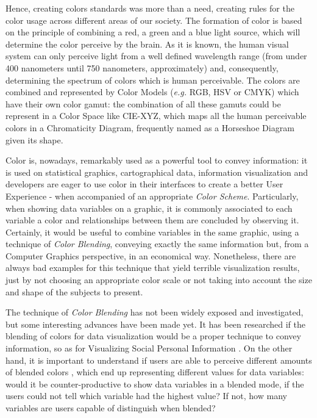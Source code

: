 %
Hence, creating colors standards was more than a need, creating rules for the color usage across different areas
of our society. The formation of color is based on the principle of combining a red, a green and a blue light
source, which will determine the color perceive by the brain. As it is known, the human visual system can only
perceive light from a well defined wavelength range (from under 400 nanometers until 750 nanometers, approximately)
and, consequently, determining the spectrum of colors which is human perceivable. The colors are combined and
represented by Color Models (\emph{e.g.} RGB, HSV or CMYK) which have their own color gamut: the combination
of all these gamuts could be represent in a Color Space like CIE-XYZ, which maps all the human perceivable
colors in a Chromaticity Diagram, frequently named as a Horseshoe Diagram given its shape. \par
%
Color is, nowadays, remarkably used as a powerful tool to convey information: it is used on statistical graphics,
cartographical data, information visualization and developers are eager to use color in their interfaces to
create a better User Experience - when accompanied of an appropriate \emph{Color Scheme}. Particularly, when
showing data variables on a graphic, it is commonly associated to each variable a color and relationships between
them are concluded by observing it. Certainly, it would be useful to combine variables in the same graphic, using
a technique of \emph{Color Blending}, conveying exactly the same information but, from a Computer Graphics
perspective, in an economical way. Nonetheless, there are always bad examples for this technique that yield
terrible visualization results, just by not choosing an appropriate color scale or not taking into account the size
and shape of the subjects to present. \par
%
The technique of \emph{Color Blending} has not been widely exposed and investigated, but some interesting advances
have been made yet. It has been researched if the blending of colors for data visualization \cite{Gama20141} would
be a proper technique to convey information, so as for Visualizing Social Personal Information \cite{Gama20143}.
On the other hand, it is important to understand if users are able to perceive different amounts of blended colors
\cite{Gama20142}, which end up representing different values for data variables: would it be counter-productive to
show data variables in a blended mode, if the users could not tell which variable had the highest value? If not,
how many variables are users capable of distinguish when blended? \par
